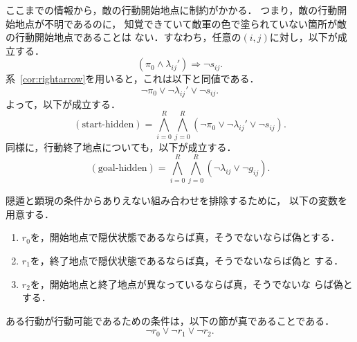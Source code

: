 ここまでの情報から，敵の行動開始地点に制約がかかる．
つまり，敵の行動開始地点が不明であるのに，
知覚できていて敵軍の色で塗られていない箇所が敵の行動開始地点であることは
ない．すなわち，任意の$(i, j)$に対し，以下が成立する．
\[
 (\pi_0 \land \lambda_{ij}') \Rightarrow \lnot s_{ij}.
\]
系~\ref{cor:rightarrow}を用いると，これは以下と同値である．
\[
 \lnot \pi_0 \lor \lnot \lambda_{ij}' \lor \lnot s_{ij}.
\]
よって，以下が成立する．
\[
 (\text{start-hidden}) = \bigwedge_{i = 0}^R
 \bigwedge_{j = 0}^R
 \left(\lnot \pi_0 \lor \lnot \lambda_{ij}' \lor \lnot s_{ij} \right).
\]
同様に，行動終了地点についても，以下が成立する．
\[
 (\text{goal-hidden}) = \bigwedge_{i = 0}^R
 \bigwedge_{j = 0}^R
 \left(\lnot \lambda_{ij} \lor \lnot g_{ij} \right).
\]

隠遁と顕現の条件からありえない組み合わせを排除するために，
以下の変数を用意する．

\begin{nota} \label{nota:r_s}
 \begin{enumerate}[1.]
  \item $r_0$を，開始地点で隠伏状態であるならば真，そうでないならば偽とする．
  \item $r_1$を，終了地点で隠伏状態であるならば真，そうでないならば偽と
        する．
  \item $r_2$を，開始地点と終了地点が異なっているならば真，そうでないな
        らば偽とする．
 \end{enumerate}
\end{nota}

\begin{prop} \label{prop:kengen_inpuku}
 ある行動が行動可能であるための条件は，以下の節が真であることである．
 \begin{equation}
  \lnot r_0 \lor \lnot r_1 \lor \lnot r_2.
   \label{eq:kengen_inpuku}
 \end{equation}
\end{prop}

